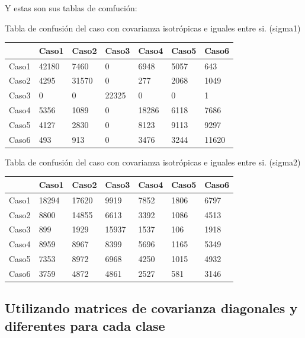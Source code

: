 \documentclass[a4paper,10pt]{article}
\begin{document}
Y estas son sus tablas de comfuci\'on:

Tabla de confusi\'on del caso con covarianza isotr\'opicas e iguales entre si. (sigma1)\newline
\begin{tabular}{| l | l | l | l | l | l | l | }
      & Caso1 & Caso2 & Caso3 & Caso4 & Caso5 & Caso6\\ \hline
Caso1 &       42180     &   7460         &  0  &      6948      &  5057 &        643\\ \hline
Caso2 &        4295     &  31570        &   0   &      277     &   2068  &      1049\\ \hline
Caso3 &           0      &     0       &22325    &       0    &       0   &        1\\ \hline
Caso4 &        5356       & 1089       &    0     &  18286   &     6118    &    7686\\ \hline
Caso5 &        4127       & 2830      &     0      &  8123  &      9113     &   9297\\ \hline
Caso6 &         493        & 913     &      0       & 3476 &       3244      & 11620\\ \hline
\end{tabular}\newline

Tabla de confusi\'on del caso con covarianza isotr\'opicas e iguales entre si. (sigma2)\newline
\begin{tabular}{| l | l | l | l | l | l | l | }
      & Caso1 & Caso2 & Caso3 & Caso4 & Caso5 & Caso6\\ \hline
Caso1 &       18294   &    17620      &  9919 &       7852      &  1806 &       6797\\ \hline
Caso2 &        8800    &   14855     &   6613  &      3392     &   1086  &      4513\\ \hline
Caso3 &         899     &   1929    &   15937   &     1537    &     106   &     1918\\ \hline
Caso4 &        8959      &  8967   &     8399    &    5696   &     1165    &    5349\\ \hline
Caso5 &        7353       & 8972  &      6968     &   4250  &      1015     &   4932\\ \hline
Caso6 &        3759        &4872 &       4861      &  2527 &        581      &  3146\\ \hline
\end{tabular}


\subsection{Utilizando matrices de covarianza diagonales y diferentes para cada clase}
\end{document}

